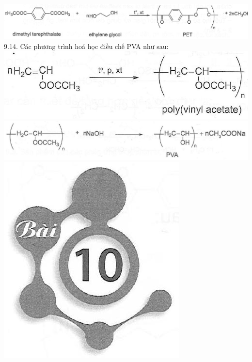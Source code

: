 \documentclass[10pt]{article}
\begin{document}
\includegraphics[max width=\textwidth, center]{2025_10_23_b4e16b74380d0f7e7700g-062(3)}\\
9.14. Các phương trình hoá học điều chế PVA như sau:\\
\includegraphics[max width=\textwidth, center]{2025_10_23_b4e16b74380d0f7e7700g-063}\\
\includegraphics[max width=\textwidth, center]{2025_10_23_b4e16b74380d0f7e7700g-063(2)}\\
\includegraphics[max width=\textwidth, center]{2025_10_23_b4e16b74380d0f7e7700g-063(1)}
\end{document}
